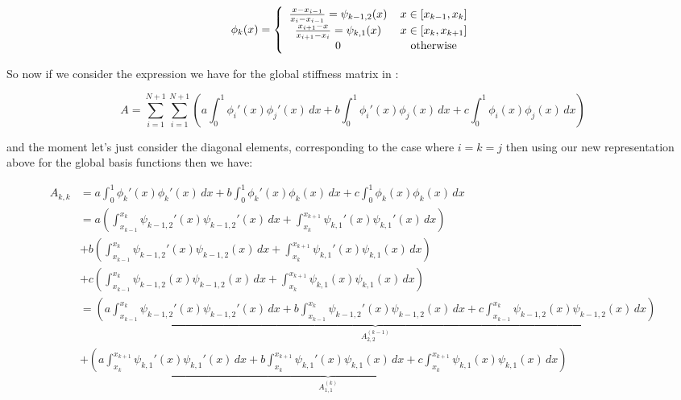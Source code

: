 \begin{equation}\label{eq:oned-deterministic-local-global-basis}
    \phi_k(x) = \left\{\begin{array}{c c}
                    \frac{x - x_{i-1}}{x_i - x_{i-1}} = \psi_{{k-1},2}(x)\, & x \in [x_{k-1}, x_k] \\
                    \frac{x_{i+1} - x}{x_{i+1} - x_i} = \psi_{k, 1}(x)\, & x \in [x_k, x_{k+1}] \\
                    0\, & \text{otherwise}
             \end{array}\right.
\end{equation}

So now if we consider the expression we have for the global stiffness matrix in
:

\[
  A  = \sum_{i=1}^{N+1}\sum_{i=1}^{N+1}\left(a\int_0^1\phi_i'(x)\phi_j'(x)\, dx
                                           + b\int_0^1\phi_i'(x)\phi_j(x)\, dx
                                           + c\int_0^1\phi_i(x)\phi_j(x)\, dx\right)
\]

and the moment let's just consider the diagonal elements, corresponding to the
case where $i = k = j$ then using our new representation above for the global
basis functions then we have:

\begin{align*}
    A_{k,k} &= a\int_0^1\phi_k'(x)\phi_k'(x)\, dx + b\int_0^1\phi_k'(x)\phi_k(x)\, dx
               + c\int_0^1\phi_k(x)\phi_k(x)\, dx \\
            &= a\left(\int_{x_{k-1}}^{x_k}\psi_{{k-1},2}'(x)\psi_{{k-1},2}'(x)\, dx
                       + \int_{x_k}^{x_{k+1}}\psi_{k,1}'(x)\psi_{k,1}'(x)\, dx\right) \\
             &+ b \left(\int_{x_{k-1}}^{x_k}\psi_{k-1,2}'(x)\psi_{k-1,2}(x)\, dx
                       + \int_{x_k}^{x_{k+1}}\psi_{k,1}'(x)\psi_{k,1}(x)\, dx\right) \\
             &+ c \left(\int_{x_{k-1}}^{x_k}\psi_{k-1,2}(x)\psi_{k-1,2}(x)\, dx
                       + \int_{x_k}^{x_{k+1}}\psi_{k,1}(x)\psi_{k,1}(x)\, dx\right) \\
            &= \underbrace{\left(a\int_{x_{k-1}}^{x_k}\psi_{k-1,2}'(x)\psi_{k-1,2}'(x)\, dx
                       + b\int_{x_{k-1}}^{x_k}\psi_{k-1,2}'(x)\psi_{k-1,2}(x)\, dx
                       + c\int_{x_{k-1}}^{x_k}\psi_{k-1,2}(x)\psi_{k-1,2}(x)\, dx\right)}_{A^{(k-1)}_{2,2}} \\
            &+ \underbrace{\left(a\int_{x_k}^{x_{k+1}}\psi_{k,1}'(x)\psi_{k,1}'(x)\, dx
                       + b\int_{x_k}^{x_{k+1}}\psi_{k,1}'(x)\psi_{k,1}(x)\, dx
                       + c\int_{x_k}^{x_{k+1}}\psi_{k,1}(x)\psi_{k,1}(x)\, dx\right)}_{A^{(k)}_{1,1}}
\end{align*}

